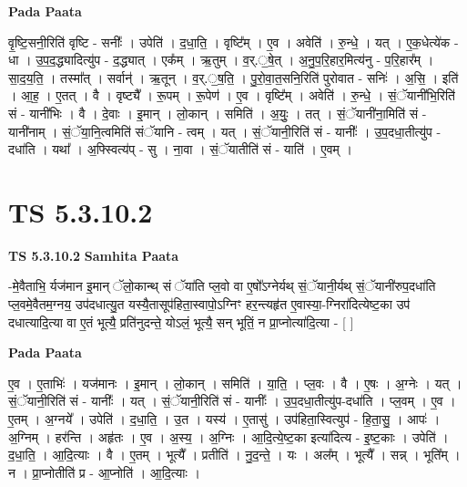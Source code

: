 \documentclass[17pt]{extarticle}
\begin{document}
\textbf{Pada Paata} \newline

वृ॒ष्टि॒सनी॒रिति॑ वृष्टि - सनीः᳚ । उपेति॑ । द॒धा॒ति॒ । वृष्टि᳚म् । ए॒व । अवेति॑ । रु॒न्धे॒ । यत् । ए॒क॒धेत्ये॑क - धा । उ॒प॒द॒द्ध्यादित्यु॑प - द॒द्ध्यात् । एक᳚म् । ऋ॒तुम् । व॒र्.॒षे॒त् । अ॒नु॒प॒रि॒हार॒मित्य॑नु - प॒रि॒हार᳚म् । सा॒द॒य॒ति॒ । तस्मा᳚त् । सर्वान्॑ । ऋ॒तून् । व॒र्.॒ष॒ति॒ । पु॒रो॒वा॒त॒सनि॒रिति॑ पुरोवात - सनिः॑ । अ॒सि॒ । इति॑ । आ॒ह॒ । ए॒तत् । वै । वृष्ट्यै᳚ । रू॒पम् । रू॒पेण॑ । ए॒व । वृष्टि᳚म् । अवेति॑ । रु॒न्धे॒ । सं॒ॅयानी॑भि॒रिति॑ सं - यानी॑भिः । वै । दे॒वाः । इ॒मान् । लो॒कान् । समिति॑ । अ॒युः॒ । तत् । सं॒ॅयानी॑ना॒मिति॑ सं - यानी॑नाम् । सं॒ॅया॒नि॒त्वमिति॑ संॅयानि - त्वम् । यत् । सं॒ॅयानी॒रिति॑ सं - यानीः᳚ । उ॒प॒दधा॒तीत्यु॑प - दधा॑ति । यथा᳚ । अ॒फ्स्वित्य॑प् - सु । ना॒वा । सं॒ॅयातीति॑ सं - याति॑ । ए॒वम् ।  \newline




\section*{ TS 5.3.10.2 }

\textbf{TS 5.3.10.2 } \newline
\textbf{Samhita Paata} \newline

-मे॒वैताभि॒ र्यज॑मान इ॒मान् ॅलो॒कान्थ् सं ॅया॑ति प्ल॒वो वा ए॒षो᳚ऽग्नेर्यथ् सं॒ॅयानी॒र्यथ् सं॒ॅयानी॑रुप॒दधा॑ति प्ल॒वमे॒वैतम॒ग्नय॒ उप॑दधात्यु॒त यस्यै॒तासूप॑हिता॒स्वापो॒ऽग्निꣳ हर॒न्त्यहृ॑त ए॒वास्या॒-ग्निरा॑दित्येष्ट॒का उप॑ दधात्यादि॒त्या वा ए॒तं भूत्यै॒ प्रति॑नुदन्ते॒ योऽलं॒ भूत्यै॒ सन् भूतिं॒ न प्रा॒प्नोत्या॑दि॒त्या - [  ] \newline

\textbf{Pada Paata} \newline

ए॒व । ए॒ताभिः॑ । यज॑मानः । इ॒मान् । लो॒कान् । समिति॑ । या॒ति॒ । प्ल॒वः । वै । ए॒षः । अ॒ग्नेः । यत् । सं॒ॅयानी॒रिति॑ सं - यानीः᳚ । यत् । सं॒ॅयानी॒रिति॑ सं - यानीः᳚ । उ॒प॒दधा॒तीत्यु॑प-दधा॑ति । प्ल॒वम् । ए॒व । ए॒तम् । अ॒ग्नये᳚ । उपेति॑ । द॒धा॒ति॒ । उ॒त । यस्य॑ । ए॒तासु॑ । उप॑हिता॒स्वित्युप॑ - हि॒ता॒सु॒ । आपः॑ । अ॒ग्निम् । हर॑न्ति । अहृ॑तः । ए॒व । अ॒स्य॒ । अ॒ग्निः । आ॒दि॒त्ये॒ष्ट॒का इत्या॑दित्य - इ॒ष्ट॒काः । उपेति॑ । द॒धा॒ति॒ । आ॒दि॒त्याः । वै । ए॒तम् । भूत्यै᳚ । प्रतीति॑ । नु॒द॒न्ते॒ । यः । अल᳚म् । भूत्यै᳚ । सन्न् । भूति᳚म् । न । प्रा॒प्नोतीति॑ प्र - आ॒प्नोति॑ । आ॒दि॒त्याः ।  \newline
\end{document}
